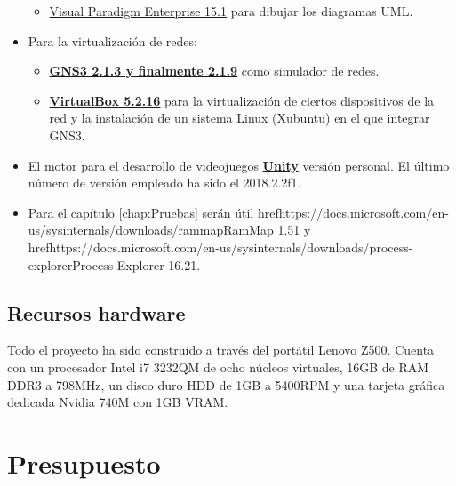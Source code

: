 \begin{itemize}
\begin{itemize}
\item \href{https://www.visual-paradigm.com/}{Visual Paradigm Enterprise 15.1} para dibujar los diagramas UML.
\end{itemize}
\item Para la virtualización de redes:
\begin{itemize}
\item \href{https://www.gns3.com/}{\textbf{GNS3 2.1.3 y finalmente 2.1.9}} como simulador de redes.
\item \href{https://www.virtualbox.org/}{\textbf{VirtualBox 5.2.16}} para la virtualización de ciertos dispositivos de la red y la instalación de un sistema Linux (Xubuntu) en el que integrar GNS3.
\end{itemize}
\item El motor para el desarrollo de videojuegos \href{https://unity3d.com/es}{\textbf{Unity}} versión personal. El último número de versión empleado ha sido el 2018.2.2f1.
\item Para el capítulo \ref{chap:Pruebas} serán útil href{https://docs.microsoft.com/en-us/sysinternals/downloads/rammap}{RamMap 1.51} y href{https://docs.microsoft.com/en-us/sysinternals/downloads/process-explorer}{Process Explorer 16.21}.
\end{itemize}

\subsection{Recursos hardware}
Todo el proyecto ha sido construido a través del portátil Lenovo Z500. Cuenta con un procesador Intel i7 3232QM de ocho núcleos virtuales, 16GB de RAM DDR3 a 798MHz, un disco duro HDD de 1GB a 5400RPM y una tarjeta gráfica dedicada Nvidia 740M con 1GB VRAM.

\section{Presupuesto}



